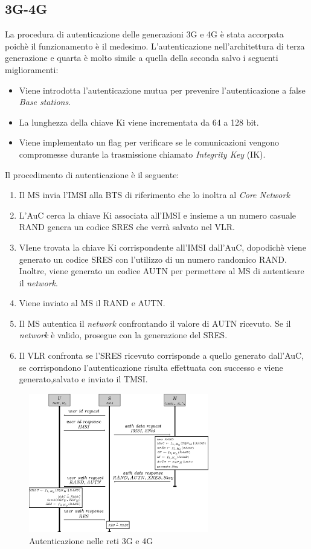 \subsection{3G-4G}
La procedura di autenticazione delle generazioni 3G e 4G è stata accorpata poichè il funzionamento è il medesimo.
L'autenticazione nell'architettura di terza generazione e quarta è molto simile a quella della seconda salvo i seguenti miglioramenti:
\begin{itemize}
    \item Viene introdotta l'autenticazione mutua per prevenire l'autenticazione a false \textit{Base stations}.
    \item La lunghezza della chiave Ki viene incrementata da 64 a 128 bit.
    \item Viene implementato un flag per verificare se le comunicazioni vengono compromesse durante la trasmissione chiamato \textit{Integrity Key} (IK).
\end{itemize}
Il procedimento di autenticazione è il seguente:
\begin{enumerate}
    \item Il MS invia l'IMSI alla BTS di riferimento che lo inoltra al \textit{Core Network}
    \item L'AuC cerca la chiave Ki associata all'IMSI e insieme a un numero casuale RAND genera un codice SRES che verrà
    salvato nel VLR.
    \item VIene trovata la chiave Ki corrispondente all'IMSI dall'AuC, dopodichè viene generato un codice SRES con l'utilizzo di un numero randomico RAND.
    Inoltre, viene generato un codice AUTN per permettere al MS di autenticare il \textit{network}.
    \item Viene inviato al MS il RAND e AUTN.
    \item Il MS autentica il \textit{network} confrontando il valore di AUTN ricevuto. Se il \textit{network} è valido, prosegue con la generazione del SRES.
    \item Il VLR confronta se l'SRES ricevuto corrisponde a quello generato dall'AuC, se corrispondono l'autenticazione risulta
    effettuata con successo e viene generato,salvato e inviato il TMSI.
\end{enumerate}
\begin{figure}[h]
    \centering
    \includegraphics[width=0.7\textwidth]{images/auth-3g.png}
    \caption{Autenticazione nelle reti 3G e 4G}
\end{figure}

